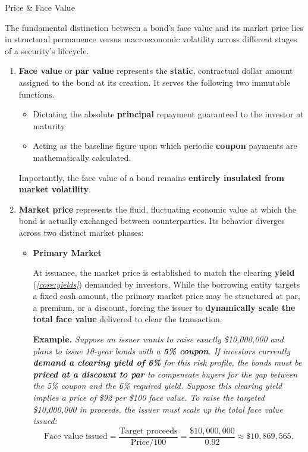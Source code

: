 \documentclass[10pt]{article}
\begin{document}
    \begin{core}{Price \& Face Value}

      The fundamental distinction between a bond's face value and its market price lies in structural permanence versus macroeconomic volatility across different stages of a security's lifecycle.

      \begin{enumerate}

        \item \textbf{Face value} or \textbf{par value} represents the \textbf{static}, contractual dollar amount assigned to the bond at its creation. It serves the following two immutable functions.

        \begin{itemize}

          \item Dictating the absolute \textbf{principal} repayment guaranteed to the investor at maturity

          \item Acting as the baseline figure upon which periodic \textbf{coupon} payments are mathematically calculated. 

        \end{itemize}

        Importantly, the face value of a bond remains \textbf{entirely insulated from market volatility}.

        \item \textbf{Market price} represents the fluid, fluctuating economic value at which the bond is actually exchanged between counterparties. Its behavior diverges across two distinct market phases:

        \begin{itemize}

          \item \textbf{Primary Market}

          At issuance, the market price is established to match the clearing \textbf{yield} (\textit{\autoref{core:yields}}) demanded by investors. While the borrowing entity targets a fixed cash amount, the primary market price may be structured at par, a premium, or a discount, forcing the issuer to \textbf{dynamically scale the total face value} delivered to clear the transaction.

          \textbf{Example.} \textit{Suppose an issuer wants to raise exactly \$10{,}000{,}000 and plans to issue 10-year bonds with a \textbf{5\% coupon}. If investors currently \textbf{demand a clearing yield of 6\%} for this risk profile, the bonds must be \textbf{priced at a discount to par} to compensate buyers for the gap between the 5\% coupon and the 6\% required yield. Suppose this clearing yield implies a price of \$92 per \$100 face value. To raise the targeted \$10{,}000{,}000 in proceeds, the issuer must scale up the total face value issued:}
          \[
            \text{Face value issued} = \frac{\text{Target proceeds}}{\text{Price} / 100} = \frac{\$10{,}000{,}000}{0.92} \approx \$10{,}869{,}565.
          \]


\end{itemize}
\end{enumerate}
\end{core}
\end{document}
